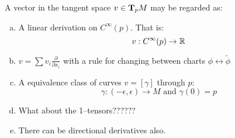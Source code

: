 \begin{remarks}
A vector in the tangent space $v\in \text{\textbf{T}}_pM$ may be regarded as:
\begin{enumerate}[a)]
    \item A linear derivation on $C^\infty(p)$. That is: $$v: C^\infty(p) \to \mathbb{R}$$
    \item $v=\sum v_i \frac{\partial}{\partial x_i} $ with a rule for changing between charts $\phi \leftrightarrow \tilde \phi$
    \item A equivalence class of curves $v=[\gamma]$ through $p$:
        $$\gamma:(-\epsilon,\epsilon)\to M \text{ and } \gamma(0)=p$$
\item What about the 1--tensors??????  
\item There can be directional derivatives also.
\end{enumerate}
\end{remarks}

